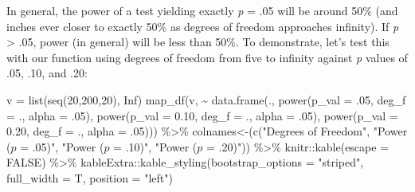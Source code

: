 \documentclass[
]{book}
\newenvironment{Shaded}{\begin{snugshade}}{\end{snugshade}}
\newcommand{\AttributeTok}[1]{\textcolor[rgb]{0.77,0.63,0.00}{#1}}
\newcommand{\ConstantTok}[1]{\textcolor[rgb]{0.00,0.00,0.00}{#1}}
\newcommand{\DecValTok}[1]{\textcolor[rgb]{0.00,0.00,0.81}{#1}}
\newcommand{\FloatTok}[1]{\textcolor[rgb]{0.00,0.00,0.81}{#1}}
\newcommand{\FunctionTok}[1]{\textcolor[rgb]{0.00,0.00,0.00}{#1}}
\newcommand{\NormalTok}[1]{#1}
\newcommand{\OtherTok}[1]{\textcolor[rgb]{0.56,0.35,0.01}{#1}}
\newcommand{\SpecialCharTok}[1]{\textcolor[rgb]{0.00,0.00,0.00}{#1}}
\newcommand{\StringTok}[1]{\textcolor[rgb]{0.31,0.60,0.02}{#1}}
\begin{document}
In general, the power of a test yielding exactly \emph{p} = .05 will be around 50\% (and inches ever closer to exactly 50\% as degrees of freedom approaches infinity). If \emph{p} \textgreater{} .05, power (in general) will be less than 50\%. To demonstrate, let's test this with our function using degrees of freedom from five to infinity against \emph{p} values of .05, .10, and .20:

\begin{Shaded}
\begin{Highlighting}[]
\NormalTok{v }\OtherTok{=} \FunctionTok{list}\NormalTok{(}\FunctionTok{seq}\NormalTok{(}\DecValTok{20}\NormalTok{,}\DecValTok{200}\NormalTok{,}\DecValTok{20}\NormalTok{), }\ConstantTok{Inf}\NormalTok{)}
\FunctionTok{map\_df}\NormalTok{(v, }\SpecialCharTok{\textasciitilde{}} \FunctionTok{data.frame}\NormalTok{(., }
                       \FunctionTok{power}\NormalTok{(}\AttributeTok{p\_val =}\NormalTok{ .}\DecValTok{05}\NormalTok{, }\AttributeTok{deg\_f =}\NormalTok{ ., }\AttributeTok{alpha =}\NormalTok{ .}\DecValTok{05}\NormalTok{), }
                       \FunctionTok{power}\NormalTok{(}\AttributeTok{p\_val =} \FloatTok{0.10}\NormalTok{, }\AttributeTok{deg\_f =}\NormalTok{ ., }\AttributeTok{alpha =}\NormalTok{ .}\DecValTok{05}\NormalTok{),}
                       \FunctionTok{power}\NormalTok{(}\AttributeTok{p\_val =} \FloatTok{0.20}\NormalTok{, }\AttributeTok{deg\_f =}\NormalTok{ ., }\AttributeTok{alpha =}\NormalTok{ .}\DecValTok{05}\NormalTok{))) }\SpecialCharTok{\%\textgreater{}\%} 
  \StringTok{\textasciigrave{}}\AttributeTok{colnames\textless{}{-}}\StringTok{\textasciigrave{}}\NormalTok{(}\FunctionTok{c}\NormalTok{(}\StringTok{"Degrees of Freedom"}\NormalTok{, }
                 \StringTok{"Power ($p$ = .05)"}\NormalTok{,}
                 \StringTok{"Power ($p$ = .10)"}\NormalTok{, }
                 \StringTok{"Power ($p$ = .20)"}\NormalTok{)) }\SpecialCharTok{\%\textgreater{}\%} 
\NormalTok{  knitr}\SpecialCharTok{::}\FunctionTok{kable}\NormalTok{(}\AttributeTok{escape =} \ConstantTok{FALSE}\NormalTok{) }\SpecialCharTok{\%\textgreater{}\%} 
\NormalTok{  kableExtra}\SpecialCharTok{::}\FunctionTok{kable\_styling}\NormalTok{(}\AttributeTok{bootstrap\_options =} \StringTok{"striped"}\NormalTok{, }
                            \AttributeTok{full\_width =}\NormalTok{ T, }
                            \AttributeTok{position =} \StringTok{"left"}\NormalTok{)}
\end{Highlighting}
\end{Shaded}
\end{document}
